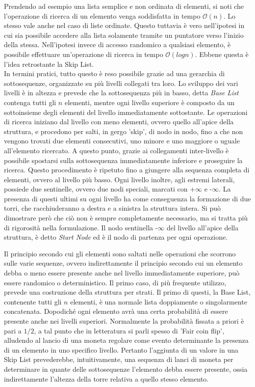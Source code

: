 	Prendendo ad esempio una lista semplice e non ordinata di elementi, si noti che l'operazione di ricerca di un elemento venga soddisfatta in tempo $\mathcal{O}(n)$. Lo stesso vale anche nel caso di liste ordinate. Questo tuttavia è vero nell'ipotesi in cui sia possibile accedere alla lista solamente tramite un puntatore verso l'inizio della stessa. Nell'ipotesi invece di accesso randomico a qualsiasi elemento, è possibile effettuare un'operazione di ricerca in tempo $\mathcal{O}(log{}n)$. Ebbene questa è l'idea retrostante la Skip List. \\
	In termini pratici, tutto questo è reso possibile grazie ad una gerarchia di sottosequenze, organizzate su più livelli collegati tra loro. Lo sviluppo dei vari livelli è in altezza e prevede che la sottosequenza più in basso, detta \textit{Base List} contenga tutti gli $ n $ elementi, mentre ogni livello superiore è composto da un sottoinsieme degli elementi del livello immediatamente sottostante. Le operazioni di ricerca iniziano dal livello con meno elementi, ovvero quello all'apice della struttura, e procedono per salti, in gergo 'skip', di nodo in nodo, fino a che non vengono trovati due elementi consecutivi, uno minore e uno maggiore o uguale all'elemento ricercato. A questo punto, grazie ai collegamenti inter-livello è possibile spostarsi sulla sottosequenza immediatamente inferiore e proseguire la ricerca. Questo procedimento è ripetuto fino a giungere alla sequenza completa di elementi, ovvero al livello più basso.
	Ogni livello inoltre, agli estremi laterali, possiede due sentinelle, ovvero due nodi speciali, marcati con $+\infty$ e -$\infty$. La presenza di questi ultimi su ogni livello ha come conseguenza la formazione di due torri, che racchiuderanno a destra e a sinistra la struttura intera. Si può dimostrare però che ciò non è sempre completamente necessario, ma si tratta più di rigorosità nella formulazione.
	Il nodo sentinella -$\infty$ del livello all'apice della struttura, è detto \textit{Start Node} ed è il nodo di partenza per ogni operazione.
	
	Il principio secondo cui gli elementi sono saltati nelle operazioni che scorrono sulle varie sequenze, ovvero indirettamente il principio secondo cui un elemento debba o meno essere presente anche nel livello immediatamente superiore, può essere randomico o deterministico. Il primo caso, di più frequente utilizzo, prevede una costruzione della struttura per strati. Il primo di questi, la Base List, contenente tutti gli $ n $ elementi, è una normale lista doppiamente o singolarmente concatenata. Dopodiché ogni elemento avrà una certa probabilità di essere presente anche nei livelli superiori. Normalmente la probabilità fissata a priori è pari a $ 1/2 $, a tal punto che in letteratura si parli spesso di 'Fair coin flip', alludendo al lancio di una moneta regolare come evento determinante la presenza di un elemento in uno specifico livello. Pertanto l'aggiunta di un valore in una Skip List prevederebbe, intuitivamente, una sequenza di lanci di moneta per determinare in quante delle sottosequenze l'elemento debba essere presente, ossia indirettamente l'altezza della torre relativa a quello stesso elemento.
	
